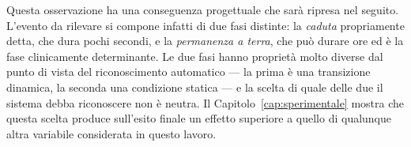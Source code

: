 %

Questa osservazione ha una conseguenza progettuale che sarà ripresa nel seguito.
L'evento da rilevare si compone infatti di due fasi distinte: la \emph{caduta}
propriamente detta, che dura pochi secondi, e la \emph{permanenza a terra}, che
può durare ore ed è la fase clinicamente determinante. Le due fasi hanno
proprietà molto diverse dal punto di vista del riconoscimento automatico — la
prima è una transizione dinamica, la seconda una condizione statica — e la
scelta di quale delle due il sistema debba riconoscere non è neutra. Il
Capitolo~\ref{cap:sperimentale} mostra che questa scelta produce sull'esito
finale un effetto superiore a quello di qualunque altra variabile considerata in
questo lavoro.
